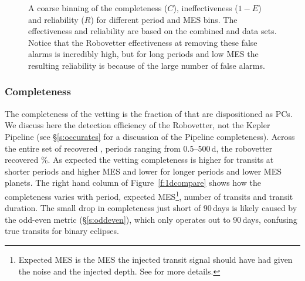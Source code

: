 \begin{figure}[ht]
\begin{center}
\caption{ A coarse binning of the completeness ($C$), ineffectiveness ($1-E$) and reliability ($R$) for different period and MES bins. The effectiveness and reliability are based on the combined \invtce{} and \scrtce{} data sets. Notice that the Robovetter effectiveness at removing these false alarms is incredibly high, but for long periods and low MES the resulting reliability is because of the large number of false alarms. }
\label{f:scoregrid}
\end{center}
\end{figure}



\subsubsection{Completeness}
The completeness of the vetting is the fraction of  that are dispositioned as PCs. We discuss here the detection efficiency of the Robovetter, not the Kepler Pipeline (see \S\ref{s:occurates} for a discussion of the Pipeline completeness). Across the entire set of recovered , periods ranging from 0.5--500\,d, the robovetter recovered \completeness{}\%. As expected the vetting completeness is higher for transits at shorter periods and higher MES and lower for longer periods and lower MES planets. The right hand column of Figure~\ref{f:1dcompare} shows how the completeness varies with period, expected MES\footnote{Expected MES is the MES the injected transit signal should have had given the noise and the injected depth. See \citet{Christiansen2017} for more details.}, number of transits and transit duration. The small drop in completeness just short of 90\,days is likely caused by the odd-even metric (\S\ref{s:oddeven}), which only operates out to 90\,days, confusing true transits for binary eclipses.  

